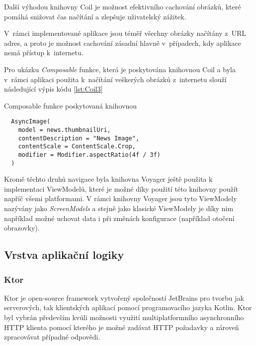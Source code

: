 Další výhodou knihovny Coil je možnost efektivního cachování obrázků, které pomáhá snižovat čas načítání a zlepšuje uživatelský zážitek.

\medskip

V~rámci implementované aplikace jsou téměř všechny obrázky načítány z~URL adres, a proto je možnost cachování zásadní hlavně v~případech, 
kdy aplikace nemá přístup k~internetu.

Pro ukázku \textit{Composable} funkce, která je poskytována knihovnou Coil a byla v~rámci
aplikaci použita k~načítání veškerých obrázků z~internetu slouží následující výpis kódu \ref{lst:Coil3}

\begin{listing}[H]
\caption{Composable funkce poskytovaná knihovnou}\label{lst:Coil3}
\begin{verbatim}
  AsyncImage(
    model = news.thumbnailUri,
    contentDescription = "News Image",
    contentScale = ContentScale.Crop,
    modifier = Modifier.aspectRatio(4f / 3f)
  )
\end{verbatim}
\end{listing}

Kromě těchto druhů navigace byla knihovna Voyager ještě použita k implementaci ViewModelů, které je možné díky použití této knihovny
použít napříč všemi platformami. V rámci knihovny Voyager jsou tyto ViewModely nazývány jako \textit{ScreenModels} a stejně jako klasické
ViewModely je díky nim například možné uchovat data i při změnách konfigurace (například otočení obrazovky). \cite{voyagerScreeNmodel}

\subsection{Vrstva aplikační logiky}

\subsubsection*{Ktor}
Ktor je open-source framework vytvořený společností JetBrains pro tvorbu jak serverových, tak klientských aplikací pomocí programovacího 
jazyka Kotlin. Ktor byl vybrán především kvůli možnosti využití multiplatformního asynchronního HTTP klienta pomocí kterého je možné zadávat 
HTTP požadavky a zároveň zpracovávat případné odpovědi. 

